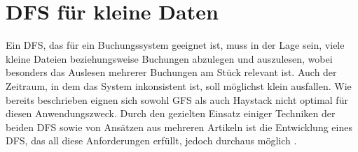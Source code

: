 \documentclass[12pt,oneside,a4paper,parskip]{scrbook}
\begin{document}
\section{DFS für kleine Daten}
\label{oneOnlyDFS}
Ein DFS, das für ein Buchungssystem geeignet ist, muss in der Lage sein, viele kleine Dateien beziehungsweise Buchungen abzulegen und auszulesen, wobei besonders das Auslesen mehrerer Buchungen am Stück relevant ist. Auch der Zeitraum, in dem das System inkonsistent ist, soll möglichst klein ausfallen. Wie bereits beschrieben eignen sich sowohl GFS als auch Haystack nicht optimal für diesen Anwendungszweck. Durch den gezielten Einsatz einiger Techniken der beiden DFS sowie von Ansätzen aus mehreren Artikeln ist die Entwicklung eines DFS, das all diese Anforderungen erfüllt, jedoch durchaus möglich \cite{hdfsSmallFiles}\cite{hadoopSmallFiles2}\cite{smallFilesHDFS3}.
\end{document}
